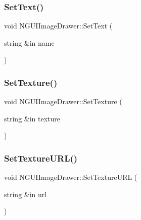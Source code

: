 \hypertarget{class_n_g_u_i_image_drawer_a19319f2af462deabc1a40cbcb0e2ddbe}{}\label{class_n_g_u_i_image_drawer_a19319f2af462deabc1a40cbcb0e2ddbe} 
\subsubsection{\texorpdfstring{Set\+Text()}{SetText()}}
{\footnotesize\ttfamily void N\+G\+U\+I\+Image\+Drawer\+::\+Set\+Text (\begin{DoxyParamCaption}\item[{string \&in}]{name }\end{DoxyParamCaption})}

\hypertarget{class_n_g_u_i_image_drawer_a78257c4b69afba4161f6f92ee1095d51}{}\label{class_n_g_u_i_image_drawer_a78257c4b69afba4161f6f92ee1095d51} 
\subsubsection{\texorpdfstring{Set\+Texture()}{SetTexture()}}
{\footnotesize\ttfamily void N\+G\+U\+I\+Image\+Drawer\+::\+Set\+Texture (\begin{DoxyParamCaption}\item[{string \&in}]{texture }\end{DoxyParamCaption})}

\hypertarget{class_n_g_u_i_image_drawer_ae37358e093d97b45f9e5a6b57851d5a6}{}\label{class_n_g_u_i_image_drawer_ae37358e093d97b45f9e5a6b57851d5a6} 
\subsubsection{\texorpdfstring{Set\+Texture\+U\+R\+L()}{SetTextureURL()}}
{\footnotesize\ttfamily void N\+G\+U\+I\+Image\+Drawer\+::\+Set\+Texture\+U\+RL (\begin{DoxyParamCaption}\item[{string \&in}]{url }\end{DoxyParamCaption})}

